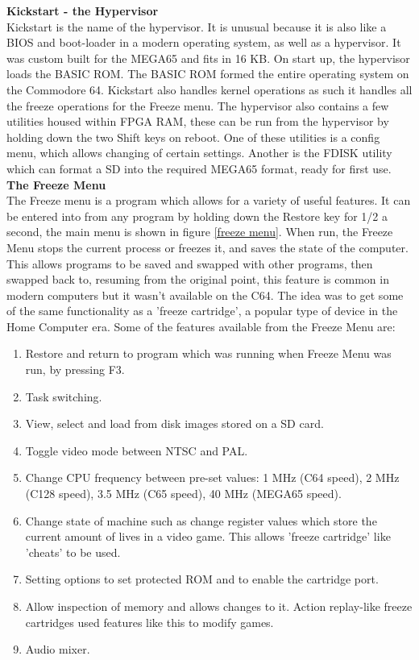 \textbf{Kickstart - the Hypervisor}\\
Kickstart is the name of the hypervisor. It is unusual because it is also like a BIOS and boot-loader in a modern operating system, as well as a hypervisor. It was custom built for the MEGA65 and fits in 16 KB. On start up, the hypervisor loads the BASIC ROM. The BASIC ROM formed the entire operating system on the Commodore 64. Kickstart also handles kernel operations as such it handles all the freeze operations for the Freeze menu. The hypervisor also contains a few utilities housed within FPGA RAM, these can be run from the hypervisor by holding down the two Shift keys on reboot. One of these utilities is a config menu, which allows changing of certain settings. Another is the FDISK utility which can format a SD into the required MEGA65 format, ready for first use.\\

\textbf{The Freeze Menu}\\
The Freeze menu is a program which allows for a variety of useful features. It can be entered into from any program by holding down the Restore key for 1/2 a second, the main menu is shown in figure \ref{freeze menu}. When run, the Freeze Menu stops the current process or freezes it, and saves the state of the computer. This allows programs to be saved and swapped with other programs, then swapped back to, resuming from the original point, this feature is common in modern computers but it wasn't available on the C64. The idea was to get some of the same functionality as a 'freeze cartridge', a popular type of device in the Home Computer era. Some of the features available from the Freeze Menu are:
\begin{enumerate}
\item Restore and return to program which was running when Freeze Menu was run, by pressing F3.
\item Task switching.
\item View, select and load from disk images stored on a SD card.
\item Toggle video mode between NTSC and PAL.
\item Change CPU frequency between pre-set values: 1 MHz (C64 speed), 2 MHz (C128 speed), 3.5 MHz (C65 speed), 40 MHz (MEGA65 speed).
\item Change state of machine such as change register values which store the current amount of lives in a video game. This allows 'freeze cartridge' like 'cheats' to be used.
\item Setting options to set protected ROM and to enable the cartridge port.
\item Allow inspection of memory and allows changes to it. Action replay-like freeze cartridges used features like this to modify games.
\item Audio mixer.
\end{enumerate}


